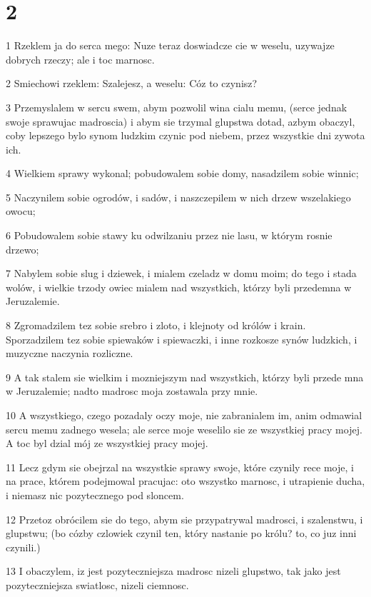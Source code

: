 \chapter{2}

\par 1 Rzeklem ja do serca mego: Nuze teraz doswiadcze cie w weselu, uzywajze dobrych rzeczy; ale i toc marnosc.
\par 2 Smiechowi rzeklem: Szalejesz, a weselu: Cóz to czynisz?
\par 3 Przemyslalem w sercu swem, abym pozwolil wina cialu memu, (serce jednak swoje sprawujac madroscia) i abym sie trzymal glupstwa dotad, azbym obaczyl, coby lepszego bylo synom ludzkim czynic pod niebem, przez wszystkie dni zywota ich.
\par 4 Wielkiem sprawy wykonal; pobudowalem sobie domy, nasadzilem sobie winnic;
\par 5 Naczynilem sobie ogrodów, i sadów, i naszczepilem w nich drzew wszelakiego owocu;
\par 6 Pobudowalem sobie stawy ku odwilzaniu przez nie lasu, w którym rosnie drzewo;
\par 7 Nabylem sobie slug i dziewek, i mialem czeladz w domu moim; do tego i stada wolów, i wielkie trzody owiec mialem nad wszystkich, którzy byli przedemna w Jeruzalemie.
\par 8 Zgromadzilem tez sobie srebro i zloto, i klejnoty od królów i krain. Sporzadzilem tez sobie spiewaków i spiewaczki, i inne rozkosze synów ludzkich, i muzyczne naczynia rozliczne.
\par 9 A tak stalem sie wielkim i mozniejszym nad wszystkich, którzy byli przede mna w Jeruzalemie; nadto madrosc moja zostawala przy mnie.
\par 10 A wszystkiego, czego pozadaly oczy moje, nie zabranialem im, anim odmawial sercu memu zadnego wesela; ale serce moje weselilo sie ze wszystkiej pracy mojej. A toc byl dzial mój ze wszystkiej pracy mojej.
\par 11 Lecz gdym sie obejrzal na wszystkie sprawy swoje, które czynily rece moje, i na prace, którem podejmowal pracujac: oto wszystko marnosc, i utrapienie ducha, i niemasz nic pozytecznego pod sloncem.
\par 12 Przetoz obrócilem sie do tego, abym sie przypatrywal madrosci, i szalenstwu, i glupstwu; (bo cózby czlowiek czynil ten, który nastanie po królu? to, co juz inni czynili.)
\par 13 I obaczylem, iz jest pozyteczniejsza madrosc nizeli glupstwo, tak jako jest pozyteczniejsza swiatlosc, nizeli ciemnosc.
